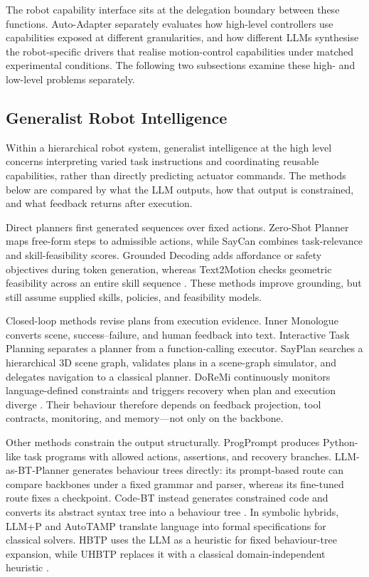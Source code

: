The robot capability interface sits at the delegation boundary between these
functions. Auto-Adapter
separately evaluates how high-level controllers use capabilities exposed at
different granularities, and how different LLMs synthesise the robot-specific
drivers that realise motion-control capabilities under matched experimental
conditions. The following two subsections examine these high- and low-level
problems separately.

\subsection{Generalist Robot Intelligence}
\label{sec:generalist-robot-intelligence}

Within a hierarchical robot system, generalist intelligence at the high level
concerns interpreting varied task instructions and coordinating reusable
capabilities, rather than directly predicting actuator commands. The methods
below are compared by what the LLM outputs, how that output is constrained,
and what feedback returns after execution.

Direct planners first generated sequences over fixed actions. Zero-Shot
Planner maps free-form steps to admissible actions, while SayCan combines
task-relevance and skill-feasibility scores. Grounded Decoding adds affordance
or safety objectives during token generation, whereas Text2Motion checks
geometric feasibility across an entire skill sequence
\citep{huang2022zeroshotplanner,ahn2022saycan,
huang2023groundeddecoding,lin2023text2motion}. These methods improve
grounding, but still assume supplied skills, policies, and feasibility models.

Closed-loop methods revise plans from execution evidence. Inner Monologue
converts scene, success--failure, and human feedback into text. Interactive
Task Planning separates a planner from a function-calling executor. SayPlan
searches a hierarchical 3D scene graph, validates plans in a scene-graph
simulator, and delegates navigation to a classical planner. DoReMi continuously
monitors language-defined constraints and triggers recovery when plan and
execution diverge
\citep{huang2023innermonologue,li2025interactiveplanning,
rana2023sayplan,guo2024doremi}. Their behaviour therefore depends on feedback
projection, tool contracts, monitoring, and memory---not only on the backbone.

Other methods constrain the output structurally. ProgPrompt produces
Python-like task programs with allowed actions, assertions, and recovery
branches. LLM-as-BT-Planner generates behaviour trees directly: its
prompt-based route can compare backbones under a fixed grammar and parser,
whereas its fine-tuned route fixes a checkpoint. Code-BT instead generates
constrained code and converts its abstract syntax tree into a behaviour tree
\citep{singh2023progprompt,ao2025llmbtplanner,zhang2025codebt}.
In symbolic hybrids, LLM+P and AutoTAMP translate language into formal
specifications for classical solvers. HBTP uses the LLM as a heuristic for
fixed behaviour-tree expansion, while UHBTP replaces it with a classical
domain-independent heuristic
\citep{liu2023llmplusp,chen2024autotamp,cai2025hbtp,chen2025btpg}.

